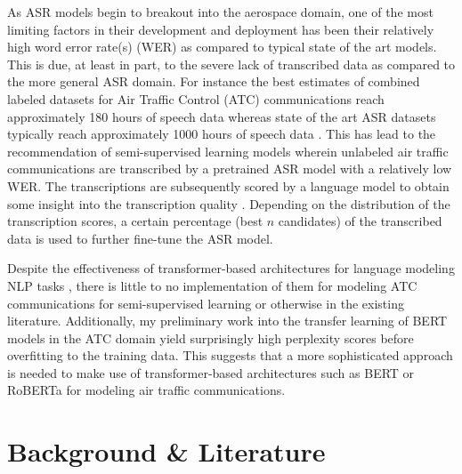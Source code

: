 \documentclass{article}
\begin{document}
        As ASR models begin to breakout into the aerospace domain, one of the most limiting factors in their
        development and deployment has been their relatively high word error rate(s) (WER)
        \cite{vsmidl2019air,juan2020automatic,badrinath_automatic_2022} as compared to typical state of the art models.
        This is due, at least in part, to the severe lack of transcribed data as compared to the more general ASR domain.
        For instance the best estimates of combined labeled datasets for Air Traffic Control (ATC)
        communications reach approximately 180 hours of speech data \cite{juan2020automatic} whereas
        state of the art ASR datasets typically reach approximately 1000 hours of speech data \cite{librispeech_2015}.
        This has lead to the recommendation of semi-supervised learning models wherein unlabeled air
        traffic communications are transcribed by a pretrained ASR model with a relatively low WER.
        The transcriptions are subsequently scored by a language model to obtain some insight into the
        transcription quality \cite{badrinath_automatic_2022,zuluaga2021contextual}.
        Depending on the distribution of the transcription scores, a certain percentage (best $n$ candidates)
        of the transcribed data is used to further fine-tune the ASR model.


        Despite the effectiveness of transformer-based architectures for language modeling NLP tasks
        \cite{devlin_bert_2019,lewis_bart_2019,liu2019roberta}, there is little to no implementation
        of them for modeling ATC communications for semi-supervised learning or otherwise in the
        existing literature.
        Additionally, my preliminary work into the transfer learning of BERT models in the ATC
        domain yield surprisingly high perplexity scores before overfitting to the training data.
        This suggests that a more sophisticated approach is needed to make use of transformer-based
        architectures such as BERT or RoBERTa for modeling air traffic communications.

    \section{Background \& Literature}

\end{document}
